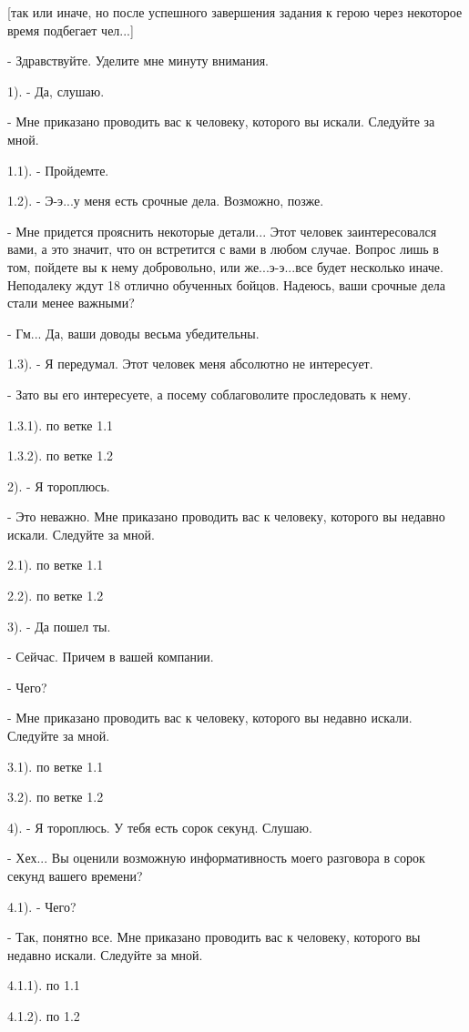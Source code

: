 \documentclass[12pt,a4paper]{book}
\begin{document}
[так или иначе, но после успешного завершения задания к герою через некоторое время подбегает чел...]

- Здравствуйте. Уделите мне минуту внимания.

1). - Да, слушаю.

- Мне приказано проводить вас к человеку, которого вы искали. Следуйте за мной.

1.1). - Пройдемте.

1.2). - Э-э...у меня есть срочные дела. Возможно, позже.

- Мне придется прояснить некоторые детали... Этот человек заинтересовался вами, а это значит, что он встретится с вами в любом случае. Вопрос лишь в том, пойдете вы к нему добровольно, или же...э-э...все будет несколько иначе. Неподалеку ждут 18 отлично обученных бойцов. Надеюсь, ваши срочные дела стали менее важными?

- Гм... Да, ваши доводы весьма убедительны.

1.3). - Я передумал. Этот человек меня абсолютно не интересует.

- Зато вы его интересуете, а посему соблаговолите проследовать к нему.

1.3.1). по ветке 1.1

1.3.2). по ветке 1.2

2). - Я тороплюсь.

- Это неважно. Мне приказано проводить вас к человеку, которого вы недавно искали. Следуйте за мной.

2.1). по ветке 1.1

2.2). по ветке 1.2

3). - Да пошел ты.

- Сейчас. Причем в вашей компании.

- Чего?

- Мне приказано проводить вас к человеку, которого вы недавно искали. Следуйте за мной.

3.1). по ветке 1.1

3.2). по ветке 1.2

4). - Я тороплюсь. У тебя есть сорок секунд. Слушаю.

- Хех... Вы оценили возможную информативность моего разговора в сорок секунд вашего времени?

4.1). - Чего?

- Так, понятно все. Мне приказано проводить вас к человеку, которого вы недавно искали. Следуйте за мной.

4.1.1). по 1.1

4.1.2). по 1.2
\end{document}
